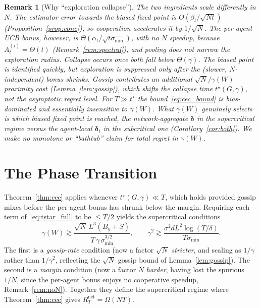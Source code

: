 \documentclass[11pt]{article}
\newtheorem*{remark}{Remark}
\begin{document}
\begin{remark}[Why ``exploration collapse'']\label{rem:mech}
The two ingredients scale differently in $N$.  The \emph{estimator
error} towards the biased fixed point is $O(\beta_t/\sqrt{Nt})$
(Proposition~\ref{prop:conc}), so cooperation \emph{accelerates} it by
$1/\sqrt N$.  The per-agent \emph{UCB bonus}, however, is
$\Theta(\alpha_t/\sqrt{t\sigma_{\min}})$, with \emph{no} $N$ speedup,
because $A_t^{(i)}=\Theta(t)$ (Remark~\ref{rem:spectral}), and pooling does
not narrow the exploration radius.  Collapse occurs once \emph{both}
fall below $\Theta(\gamma)$. The biased point is identified quickly,
but exploration is suppressed only after the (slower, $N$-independent)
bonus shrinks.  Gossip contributes an additional
$\sqrt N/\gamma(W)$ proximity cost (Lemma~\ref{lem:gossip}), which shifts
the \emph{collapse time} $t^\star(G,\gamma)$, not the asymptotic regret
\emph{level}.
For $T\gg t^\star$ the bound~\eqref{eq:cec_bound} is bias-dominated and
essentially insensitive to $\gamma(W)$.  What $\gamma(W)$ genuinely
selects is \emph{which} biased fixed point is reached, the
network-aggregate $\bm{\delta}$ in the supercritical regime versus the
agent-local $\bm{\delta}_i$ in the subcritical one
(Corollary~\ref{cor:both}).  We make no monotone or ``bathtub'' claim for
total regret in $\gamma(W)$.
\end{remark}


\section{The Phase Transition}\label{sec:phase}

Theorem~\ref{thm:cec} applies whenever $t^\star(G,\gamma)\ll T$,
which holds provided gossip mixes before the per-agent bonus has shrunk
below the margin.  Requiring each term of~\eqref{eq:tstar_full} to be
$\leq T/2$ yields the supercritical conditions
\begin{equation}
\gamma(W)\gtrsim\frac{\sqrt{N}\,L^3(B_y+S)}{T\,\gamma\,\sigma_{\min}^{3/2}},\qquad
\gamma^2\gtrsim\frac{\sigma^2 dL^2\log(T/\delta)}{T\sigma_{\min}}.
\label{eq:phase}
\end{equation}
The first is a \emph{gossip-rate} condition (now a factor $\sqrt N$
\emph{stricter}, and scaling as $1/\gamma$ rather than $1/\gamma^2$,
reflecting the $\sqrt N$ gossip bound of Lemma~\ref{lem:gossip}). The
second is a \emph{margin} condition (now a factor $N$ \emph{harder},
having lost the spurious $1/N$, since the per-agent bonus enjoys no
cooperative speedup, Remark~\ref{rem:noN}).  Together they define the
supercritical regime where Theorem~\ref{thm:cec} gives
$R_T^{\mathrm{net}}=\Omega(NT)$.
\end{document}
